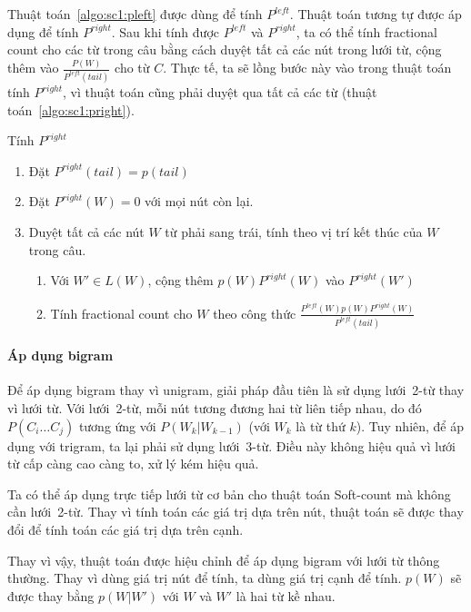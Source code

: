 \documentclass[a4paper,oneside,14pt]{extbook} %
\begin{document}
Thuật toán~\ref{algo:sc1:pleft} được dùng để tính $P^{left}$. Thuật
toán tương tự được áp dụng để tính $P^{right}$.  Sau khi tính được
$P^{left}$ và $P^{right}$, ta có thể tính fractional 
count cho các từ trong câu bằng cách duyệt tất cả các nút trong lưới từ,
cộng thêm vào $\displaystyle\frac{P(W)}{P^{left}(tail)}$ cho từ
$C$. Thực tế, ta sẽ lồng bước này vào trong thuật toán tính
$P^{right}$, vì thuật toán cũng phải duyệt qua tất cả các từ (thuật
toán~\ref{algo:sc1:pright}). 

\begin{algo}\caption{Tính $P^{right}$}
\label{algo:sc1:pright}
\begin{enumerate}
\item Đặt $P^{right}(tail) = p(tail)$
\item Đặt $P^{right}(W) = 0$ với mọi nút còn lại.
\item Duyệt tất cả các nút $W$ từ phải sang trái, tính theo vị trí kết
  thúc của $W$ trong câu.
  \begin{enumerate}
  \item Với $W' \in L(W)$, cộng thêm $p(W)P^{right}(W)$ vào
    $P^{right}(W')$
  \item Tính fractional count cho $W$ theo công thức
    $\displaystyle\frac{P^{left}(W)p(W)P^{right}(W)}{P^{left}(tail)}$
  \end{enumerate}
\end{enumerate}
\end{algo}

\paragraph{Áp dụng bigram}

Để áp dụng bigram thay vì
unigram, giải pháp đầu tiên là sử dụng lưới~2-từ thay vì lưới từ. Với
lưới~2-từ, mỗi nút tương đương hai từ liên tiếp nhau, do đó
$P(C_i\ldots C_j)$ tương ứng với $P(W_k|W_{k-1})$ (với $W_k$ là từ thứ
$k$). Tuy nhiên, để áp dụng với trigram, ta lại phải sử dụng
lưới~3-từ. Điều này không hiệu quả vì lưới từ cấp càng cao càng
to, xử lý kém hiệu quả.

Ta có thể áp dụng trực tiếp lưới từ cơ bản cho thuật toán Soft-count
mà không cần lưới~2-từ. Thay vì tính toán các giá trị dựa trên nút,
thuật toán sẽ được thay đổi để tính toán các giá trị dựa trên cạnh.

Thay vì vậy, thuật toán được hiệu chỉnh để áp dụng bigram với lưới từ
thông thường. Thay vì dùng giá trị nút để tính, ta dùng giá trị cạnh
để tính. $p(W)$ sẽ được thay bằng $p(W|W')$ với $W$ và $W'$ là hai từ
kề nhau.
\end{document}

